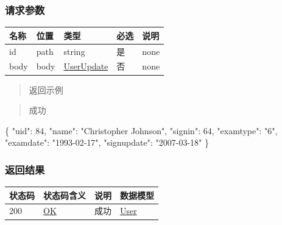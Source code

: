 \documentclass[
]{article}
\newenvironment{Shaded}{}{}
\newcommand{\DataTypeTok}[1]{\textcolor[rgb]{0.56,0.13,0.00}{#1}}
\newcommand{\DecValTok}[1]{\textcolor[rgb]{0.25,0.63,0.44}{#1}}
\newcommand{\FunctionTok}[1]{\textcolor[rgb]{0.02,0.16,0.49}{#1}}
\newcommand{\StringTok}[1]{\textcolor[rgb]{0.25,0.44,0.63}{#1}}
\begin{document}
\hypertarget{ux8bf7ux6c42ux53c2ux6570-21}{%
\subsubsection{请求参数}\label{ux8bf7ux6c42ux53c2ux6570-21}}

\begin{longtable}[]{@{}lllll@{}}
\toprule
名称 & 位置 & 类型 & 必选 & 说明 \\
\midrule
\endhead
id & path & string & 是 & none \\
body & body & \protect\hyperlink{schemauserupdate}{UserUpdate} & 否 &
none \\
\bottomrule
\end{longtable}

\begin{quote}
返回示例
\end{quote}

\begin{quote}
成功
\end{quote}

\begin{Shaded}
\begin{Highlighting}[]
\FunctionTok{\{}
  \DataTypeTok{"uid"}\FunctionTok{:} \DecValTok{84}\FunctionTok{,}
  \DataTypeTok{"name"}\FunctionTok{:} \StringTok{"Christopher Johnson"}\FunctionTok{,}
  \DataTypeTok{"signin"}\FunctionTok{:} \DecValTok{64}\FunctionTok{,}
  \DataTypeTok{"examtype"}\FunctionTok{:} \StringTok{"6"}\FunctionTok{,}
  \DataTypeTok{"examdate"}\FunctionTok{:} \StringTok{"1993{-}02{-}17"}\FunctionTok{,}
  \DataTypeTok{"signupdate"}\FunctionTok{:} \StringTok{"2007{-}03{-}18"}
\FunctionTok{\}}
\end{Highlighting}
\end{Shaded}

\hypertarget{ux8fd4ux56deux7ed3ux679c-22}{%
\subsubsection{返回结果}\label{ux8fd4ux56deux7ed3ux679c-22}}

\begin{longtable}[]{@{}llll@{}}
\toprule
状态码 & 状态码含义 & 说明 & 数据模型 \\
\midrule
\endhead
200 & \href{https://tools.ietf.org/html/rfc7231\#section-6.3.1}{OK} &
成功 & \protect\hyperlink{schemauser}{User} \\
\bottomrule
\end{longtable}
\end{document}

